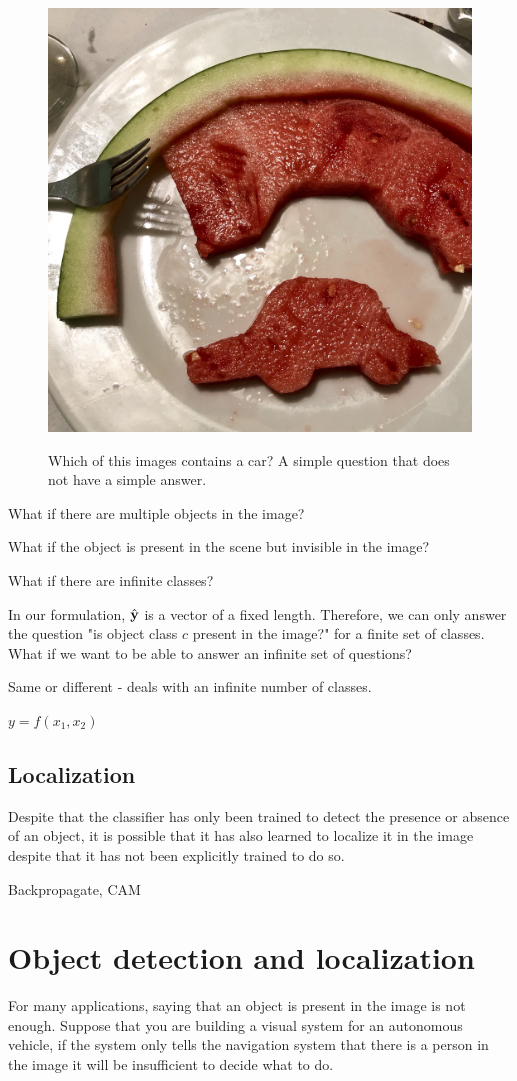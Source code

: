 \begin{figure}
{\includegraphics[width=0.32\linewidth]{figures/object_recognition/IMG_9325.jpeg}
}
\caption{Which of this images contains a car? A simple question that does not have a simple answer.}
\label{fig:whatisacar}
\end{figure}

What if there are multiple objects in the image?

What if the object is present in the scene but invisible in the image?


What if there are infinite classes?

In our formulation, $\hat {\bf y}$ is a vector of a fixed length. Therefore, we can only answer the question "is object class $c$ present in the image?" for a finite set of classes. What if we want to be able to answer an infinite set of questions?


Same or different
- deals with an infinite number of classes.

$y = f(x_1,x_2)$

\subsection{Localization}

Despite that the classifier has only been trained to detect the presence or absence of an object, it is possible that it has also learned to localize it in the image despite that it has not been explicitly trained to do so. 


Backpropagate, CAM

\section{Object detection and localization}

For many applications, saying that an object is present in the image is not enough. Suppose that you are building a visual system for an autonomous vehicle, if the system only tells the navigation system that there is a person in the image it will be insufficient to decide what to do.

